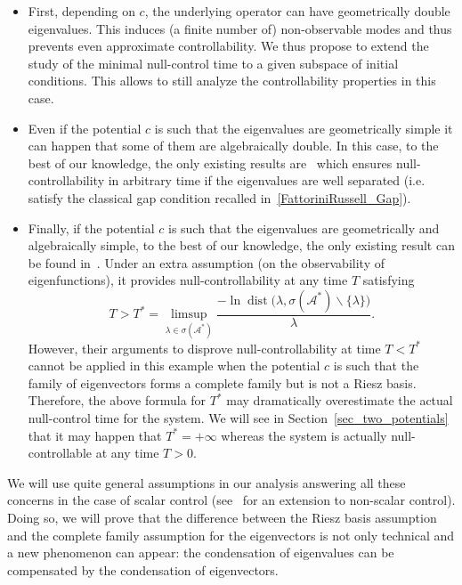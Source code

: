 \documentclass[10pt]{amsart}
\theoremstyle{definition}\newtheorem{defi}[theo]{Definition}\newtheorem{rema}[theo]{Remark}\newtheorem{exam}[theo]{Example}\newtheorem{exem}[theo]{Example}\newtheorem{nota}[theo]{Notation}
\newcommand\As{\mathcal{A}^*}
\DeclareMathOperator{\dist}{dist}
\begin{document}
\begin{itemize}
\item First, depending on $c$, the underlying operator can have geometrically double eigenvalues. This induces (a finite number of) non-observable modes and thus prevents even approximate controllability. We thus propose to extend the study of the minimal null-control time to a given subspace of initial conditions. This allows to still analyze the controllability properties in this case.
\item Even if the potential $c$ is such that the eigenvalues are geometrically simple it can happen that some of them are algebraically double. In this case, to the best of our knowledge, the only existing results are~\cite{AKBGBDT_Kalman,FCGBdT:2010} which ensures null-controllability in arbitrary time if the eigenvalues are well separated (i.e. satisfy the classical gap condition recalled in~\eqref{FattoriniRussell_Gap}).
\item Finally, if the potential $c$ is such that the eigenvalues are geometrically and algebraically simple, to the best of our knowledge, the only existing result can be found in~\cite{AmmarKhodjaBenabdallahGonzalez-BurgosdeTeresa:2014}. Under an extra assumption (on the observability of eigenfunctions), it provides null-controllability at any time $T$ satisfying
\[
T > T^* = \limsup_{ \lambda \in \sigma(\As)} \frac{ -\ln \dist\big(\lambda, \sigma(\As) \backslash \{ \lambda \} \big)}{\lambda}.
\]
However, their arguments to disprove null-controllability at time $T < T^*$ cannot be applied in this example when the potential $c$ is such that the family of eigenvectors forms a complete family but is not a Riesz basis. Therefore, the above formula for $T^*$ may dramatically overestimate the actual null-control time for the system. We will see in Section~\ref{sec_two_potentials} that it may happen that $T^*=+\infty$ whereas the system is actually null-controllable at any time $T>0$.
\end{itemize}

We will use quite general assumptions in our analysis answering all these concerns in the case of scalar control (see~\cite{BoyerMorancey} for an extension to non-scalar control). Doing so, we will prove that the difference between the Riesz basis assumption and the complete family assumption for the eigenvectors is not only technical and a new phenomenon can appear: the condensation of eigenvalues can be compensated by the condensation of eigenvectors.
\end{document}
